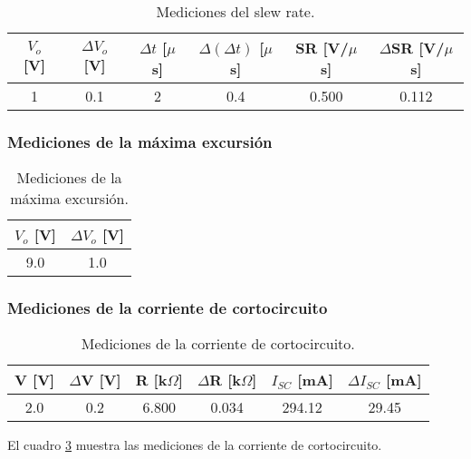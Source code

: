 \begin{table}[h!]
\centering
\begin{tabular}{|c|c|c|c|c|c|}
\hline
$V_o$ [V] & $\Delta V_o$ [V] & $\Delta t$ [$\mu$s] & $\Delta(\Delta t)$ [$\mu$s] & SR [V/$\mu$s] & $\Delta$SR [V/$\mu$s] \\ \hline
1 & 0.1 & 2 & 0.4 & 0.500 & 0.112 \\ \hline
\end{tabular}
\caption{Mediciones del slew rate.}
\label{tab:resultados-slew-rate}
\end{table}

\subsubsection{Mediciones de la máxima excursión}

\begin{table}[ht]
\centering
\begin{tabular}{|c|c|}
\hline
$V_o$ [V] & $\Delta V_o$ [V] \\ \hline
9.0 & 1.0 \\ \hline
\end{tabular}

\caption{Mediciones de la máxima excursión.}
\label{tab:resultados-maxima-excursion}
\end{table}

\subsubsection{Mediciones de la corriente de cortocircuito}

\begin{table}[h!]
\centering
\begin{tabular}{|c|c|c|c|c|c|}
\hline
V [V] & $\Delta$V [V] & R [k$\Omega$] & $\Delta$R [k$\Omega$] & $I_{SC}$ [mA] & $\Delta I_{SC}$ [mA] \\ \hline
2.0 & 0.2 & 6.800 & 0.034 & 294.12 & 29.45 \\ \hline
\end{tabular}
\caption{Mediciones de la corriente de cortocircuito.}
\label{tab:resultados-corriente-cortocircuito}
\end{table}

El cuadro \ref{tab:resultados-corriente-cortocircuito} muestra las mediciones de la corriente de cortocircuito.




